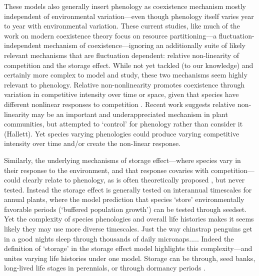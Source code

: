 \documentclass[11pt]{article}
\begin{document}
These models also generally insert phenology as coexistence mechanism mostly independent of environmental variation---even though phenology itself varies year to year with environmental variation. These current studies, like much of the work on modern coexistence theory focus on resource partitioning---a fluctuation-independent mechanism of coexistence---ignoring an additionally suite of likely relevant mechanisms that are fluctuation dependent: relative non-linearity of competition and the storage effect. While not yet tackled (to our knowledge) and certainly more complex to model and study, these two mechanisms seem highly relevant to phenology. Relative non-nonlinearity promotes coexistence through variation in competitive intensity over time or space, given that species have different nonlinear responses to competition \citep{CHESSON:1994vn,Chesson:2000vd}. Recent work suggests relative non-linearity may be an important and underappreciated mechanism in plant communities, but attempted to `control' for phenology rather than consider it (Hallett). Yet species varying phenologies could produce varying competitive intensity over time and/or create the non-linear response. 

Similarly, the underlying mechanisms of storage effect---where species vary in their response to the environment, and that response covaries with competition---could clearly relate to phenology, as is often theoretically proposed \citep{Chesson:1993gi,Chesson:2004eo}, but never tested. Instead the storage effect is generally tested on interannual timescales for annual plants, where the model prediction that species `store' environmentally favorable periods (`buffered population growth') can be tested through seedset. Yet the complexity of species phenologies and overall life histories makes it seems likely they may use more diverse timescales. Just the way chinstrap penguins get in a good nights sleep through thousands of daily micronaps.....  Indeed the definition of `storage' in the storage effect model highlights this complexity---and unites varying life histories under one model. Storage can be through, seed banks, long-lived life stages in perennials, or through dormancy periods \citep{Chesson:2000vd}. 
\end{document}
